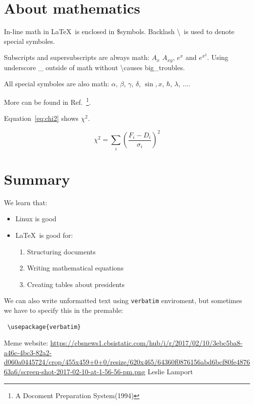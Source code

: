 \documentclass[a4paper,12pt,twoside]{article}
\begin{document}
\section{About mathematics}
\label{sec:math}

In-line math in \LaTeX \ is enclosed in \$symbols. Backlash \textbackslash \ is used to denote special symboles.

Subscripts and supersubscripts are always math: $A_x$ $A_{xy}$, $e^x$ and $e^{x^2}$. Using underscore \_ outside of math without \textbackslash causes big\_troubles.

All special symboles are also math: $\alpha$, $\beta$, $\gamma$, $\delta$, $\sin, x$, $\hbar$, $\lambda$, $\ldots$.

More can be found in Ref.~\footnote{A Docoment Preparation System(1994)}.

Equation~\ref{eq:chi2} shows $\chi^2$.

\begin{equation}
 \label{eq:chi2}
  \chi^2 = \sum\limits_i \left(\frac{F_i-D_i}{\sigma_i}\right)^2
\end{equation}


\section{Summary}
\label{sec:sum}

We learn that:
\begin{itemize}
 \item Linux is good
 \item \LaTeX \ is good for:
 \begin{enumerate}
  \item Structuring documents
  \item Writing mathematical equations
  \item Creating tables about presidents
 \end{enumerate}

\end{itemize}

We can also write unformatted text using \texttt{verbatim} enviroment, but sometimes we have to specify this in the premable:
\begin{verbatim}
 \usepackage{verbatim}
\end{verbatim}


\begin{thebibliography}{99}
   Meme website: \url{https://cbsnews1.cbsistatic.com/hub/i/r/2017/02/10/3ebc5ba8-a46c-4bc3-82a2-d060a0445724/crop/455x459+0+0/resize/620x465/64360f0876156abd6bcf80fe487663a6/screen-shot-2017-02-10-at-1-56-56-pm.png}
   Leslie Lamport
\end{thebibliography}
\end{document}
